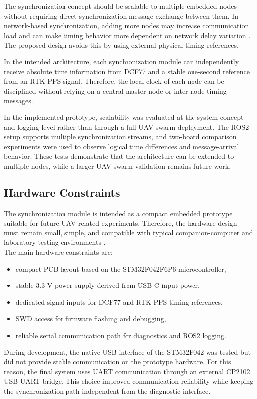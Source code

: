 The synchronization concept should be scalable to multiple embedded nodes without requiring direct synchronization-message exchange between them. In network-based synchronization, adding more nodes may increase communication load and can make timing behavior more dependent on network delay variation \cite{lopez2021uavmesh}. The proposed design avoids this by using external physical timing references.

In the intended architecture, each synchronization module can independently receive absolute time information from DCF77 and a stable one-second reference from an RTK PPS signal. Therefore, the local clock of each node can be disciplined without relying on a central master node or inter-node timing messages.

In the implemented prototype, scalability was evaluated at the system-concept and logging level rather than through a full UAV swarm deployment. The ROS2 setup supports multiple synchronization streams, and two-board comparison experiments were used to observe logical time differences and message-arrival behavior. These tests demonstrate that the architecture can be extended to multiple nodes, while a larger UAV swarm validation remains future work.

\subsection{Hardware Constraints}

The synchronization module is intended as a compact embedded prototype suitable for future UAV-related experiments. Therefore, the hardware design must remain small, simple, and compatible with typical companion-computer and laboratory testing environments \cite{r2,r7}.
\\
The main hardware constraints are:
\begin{itemize}
    \item compact PCB layout based on the STM32F042F6P6 microcontroller,
    \item stable 3.3 V power supply derived from USB-C input power,
    \item dedicated signal inputs for DCF77 and RTK PPS timing references,
    \item SWD access for firmware flashing and debugging,
    \item reliable serial communication path for diagnostics and ROS2 logging.
\end{itemize}

During development, the native USB interface of the STM32F042 was tested but did not provide stable communication on the prototype hardware. For this reason, the final system uses UART communication through an external CP2102 USB-UART bridge. This choice improved communication reliability while keeping the synchronization path independent from the diagnostic interface.


